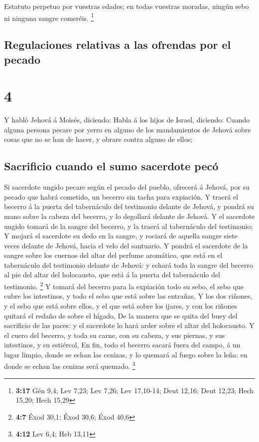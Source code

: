  Estatuto perpetuo por vuestras edades; en todas vuestras
moradas, ningún sebo ni ninguna sangre comeréis. \footnote{\textbf{3:17}
  Gén 9,4; Lev 7,23; Lev 7,26; Lev 17,10-14; Deut 12,16; Deut 12,23;
  Hech 15,20; Hech 15,29}

\hypertarget{regulaciones-relativas-a-las-ofrendas-por-el-pecado}{%
\subsection{Regulaciones relativas a las ofrendas por el
pecado}\label{regulaciones-relativas-a-las-ofrendas-por-el-pecado}}

\hypertarget{section-3}{%
\section{4}\label{section-3}}

 Y habló Jehová á Moisés, diciendo:  Habla á los
hijos de Israel, diciendo: Cuando alguna persona pecare por yerro en
alguno de los mandamientos de Jehová sobre cosas que no se han de hacer,
y obrare contra alguno de ellos;

\hypertarget{sacrificio-cuando-el-sumo-sacerdote-pecuxf3}{%
\subsection{Sacrificio cuando el sumo sacerdote
pecó}\label{sacrificio-cuando-el-sumo-sacerdote-pecuxf3}}

 Si sacerdote ungido pecare según el pecado del pueblo,
ofrecerá á Jehová, por su pecado que habrá cometido, un becerro sin
tacha para expiación.  Y traerá el becerro á la puerta del
tabernáculo del testimonio delante de Jehová, y pondrá su mano sobre la
cabeza del becerro, y lo degollará delante de Jehová.  Y el
sacerdote ungido tomará de la sangre del becerro, y la traerá al
tabernáculo del testimonio;  Y mojará el sacerdote su dedo
en la sangre, y rociará de aquella sangre siete veces delante de Jehová,
hacia el velo del santuario.  Y pondrá el sacerdote de la
sangre sobre los cuernos del altar del perfume aromático, que está en el
tabernáculo del testimonio delante de Jehová: y echará toda la sangre
del becerro al pie del altar del holocausto, que está á la puerta del
tabernáculo del testimonio. \footnote{\textbf{4:7} Éxod 30,1; Éxod 30,6;
  Éxod 40,6}  Y tomará del becerro para la expiación todo su
sebo, el sebo que cubre los intestinos, y todo el sebo que está sobre
las entrañas,  Y los dos riñones, y el sebo que está sobre
ellos, y el que está sobre los ijares, y con los riñones quitará el
redaño de sobre el hígado,  De la manera que se quita del
buey del sacrificio de las paces: y el sacerdote lo hará arder sobre el
altar del holocausto.  Y el cuero del becerro, y toda su
carne, con su cabeza, y sus piernas, y sus intestinos, y su estiércol,
 En fin, todo el becerro sacará fuera del campo, á un lugar
limpio, donde se echan las cenizas, y lo quemará al fuego sobre la leña:
en donde se echan las cenizas será quemado. \footnote{\textbf{4:12} Lev
  6,4; Heb 13,11}

